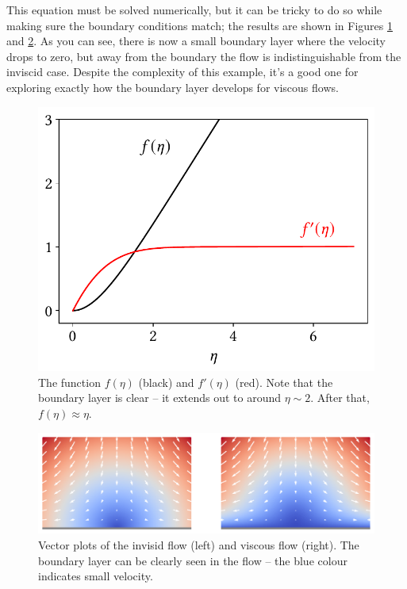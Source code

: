 This equation must be solved numerically, but it can be tricky to do so while making sure the boundary conditions match; the results are shown in Figures \ref{fig_boundary_result1} and \ref{fig_boundary_result2}.  As you can see, there is now a small boundary layer where the velocity drops to zero, but away from the boundary the flow is indistinguishable from the inviscid case.  Despite the complexity of this example, it's a good one for exploring exactly how the boundary layer develops for viscous flows.

\begin{figure}
\centering
\includegraphics[width=0.7\linewidth]{Figures/Chapter6/fig_boundary_result1}
\caption{The function $f(\eta)$ (black) and $f'(\eta)$ (red).  Note that the boundary layer is clear -- it extends out to around $\eta \sim 2$.  After that, $f(\eta) \approx \eta$. }
\label{fig_boundary_result1}
\end{figure}

\begin{figure}
\centering
\includegraphics[width=\linewidth]{Figures/Chapter6/fig_boundary_result2}
\caption{Vector plots of the invisid flow (left) and viscous flow (right).  The boundary layer can be clearly seen in the flow -- the blue colour indicates small velocity. }
\label{fig_boundary_result2}
\end{figure}

%
% 

